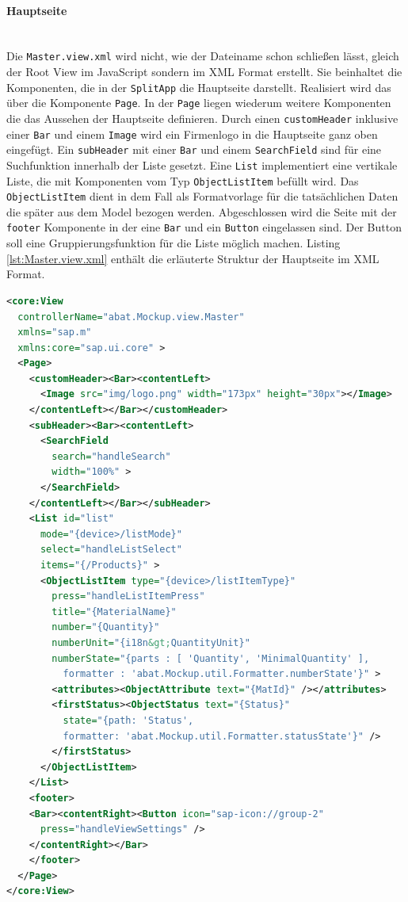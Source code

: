 \paragraph{Hauptseite}$\;$ \\
Die \texttt{Master.view.xml} wird nicht, wie der Dateiname schon schließen lässt, gleich der Root View im JavaScript sondern im XML Format erstellt. Sie beinhaltet die Komponenten, die in der \texttt{SplitApp} die Hauptseite darstellt. Realisiert wird das über die Komponente \texttt{Page}. In der \texttt{Page} liegen wiederum weitere Komponenten die das Aussehen der Hauptseite definieren. Durch einen \texttt{customHeader} inklusive einer \texttt{Bar} und einem \texttt{Image} wird ein Firmenlogo in die Hauptseite ganz oben eingefügt. Ein \texttt{subHeader} mit einer \texttt{Bar} und einem \texttt{SearchField} sind für eine Suchfunktion innerhalb der Liste gesetzt. Eine \texttt{List} implementiert eine vertikale Liste, die mit Komponenten vom Typ \texttt{ObjectListItem} befüllt wird. Das \texttt{ObjectListItem} dient in dem Fall als Formatvorlage für die tatsächlichen Daten die später aus dem Model bezogen werden. Abgeschlossen wird die Seite mit der \texttt{footer} Komponente in der eine \texttt{Bar} und ein \texttt{Button} eingelassen sind. Der Button soll eine Gruppierungsfunktion für die Liste möglich machen. Listing \ref{lst:Master.view.xml} enthält die erläuterte Struktur der Hauptseite im XML Format.

\vspace{1em}
\begin{lstlisting}[language=XML, caption=Hauptseite der SplitApp, label=lst:Master.view.xml]
<core:View
  controllerName="abat.Mockup.view.Master"
  xmlns="sap.m"
  xmlns:core="sap.ui.core" >
  <Page>
    <customHeader><Bar><contentLeft>
      <Image src="img/logo.png" width="173px" height="30px"></Image>
    </contentLeft></Bar></customHeader>
    <subHeader><Bar><contentLeft>
      <SearchField
        search="handleSearch"
        width="100%" >
      </SearchField>
    </contentLeft></Bar></subHeader>
    <List id="list"
      mode="{device>/listMode}"
      select="handleListSelect"
      items="{/Products}" >
      <ObjectListItem type="{device>/listItemType}"
        press="handleListItemPress"
        title="{MaterialName}"
        number="{Quantity}"
        numberUnit="{i18n&gt;QuantityUnit}"
        numberState="{parts : [ 'Quantity', 'MinimalQuantity' ],
          formatter : 'abat.Mockup.util.Formatter.numberState'}" >
        <attributes><ObjectAttribute text="{MatId}" /></attributes>
        <firstStatus><ObjectStatus text="{Status}"
          state="{path: 'Status',
          formatter: 'abat.Mockup.util.Formatter.statusState'}" />
        </firstStatus>
      </ObjectListItem>
    </List>
    <footer>
    <Bar><contentRight><Button icon="sap-icon://group-2"
      press="handleViewSettings" />
    </contentRight></Bar>
    </footer>
  </Page>
</core:View>
\end{lstlisting}

